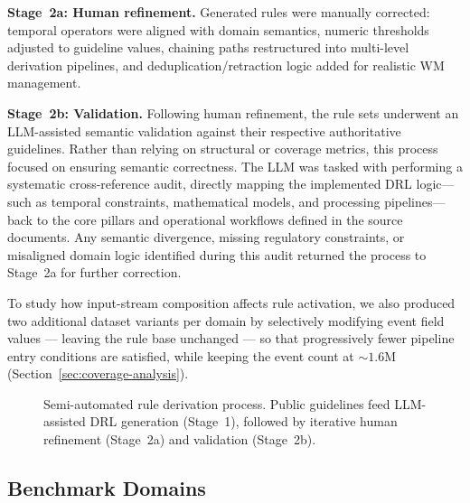 \textbf{Stage~2a: Human refinement.}
Generated rules were manually corrected: temporal operators were aligned with domain semantics, numeric thresholds adjusted to guideline values, chaining paths restructured into multi-level derivation pipelines, and deduplication/retraction logic added for realistic WM management.

\textbf{Stage~2b: Validation.}
Following human refinement, the rule sets underwent an LLM-assisted semantic validation against their respective authoritative guidelines.
Rather than relying on structural or coverage metrics, this process focused on ensuring semantic correctness.
The LLM was tasked with performing a systematic cross-reference audit, directly mapping the implemented DRL logic---such as temporal constraints, mathematical models, and processing pipelines---back to the core pillars and operational workflows defined in the source documents.
Any semantic divergence, missing regulatory constraints, or misaligned domain logic identified during this audit returned the process to Stage~2a for further correction.

To study how input-stream composition affects rule activation, we also produced two additional dataset variants per domain by selectively modifying event field values --- leaving the rule base unchanged --- so that progressively fewer pipeline entry conditions are satisfied, while keeping the event count at ${\sim}1.6$M (Section~\ref{sec:coverage-analysis}).

\begin{figure}[t]
  \centering
  \caption{Semi-automated rule derivation process. Public guidelines feed LLM-assisted DRL generation (Stage~1), followed by iterative human refinement (Stage~2a) and validation (Stage~2b).}\label{fig:derivation}
\end{figure}

\subsection{Benchmark Domains}\label{sec:domains}

